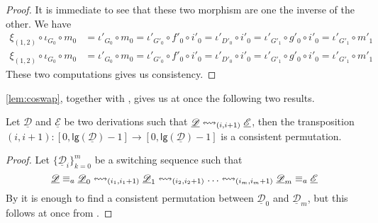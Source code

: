 \documentclass[a4paper,UKenglish,cleveref,pdftex,thm-restate,numberwithinsect]{lipics-v2021}
\newcommand{\dder}[1]{\mathscr{#1}}
\newcommand{\der}[1]{\underline{\dder{#1}}}
\newcommand{\lgh}[0]{\mathsf{lg}}
\newcommand{\shift}[1]{\ensuremath{\mathrel{{\leftrightsquigarrow}_{#1}}}}
\begin{document}
\begin{proof}
	It is immediate to see that these two morphism are one the inverse of the other. We have
\begin{align*}		\xi_{(1,2)}\circ \iota_{G_0}\circ m_0&= \iota'_{G_0}\circ m_0=\iota'_{G'_0}\circ f'_0
	\circ i'_0=\iota'_{D'_0}\circ i'_0=	\iota'_{G'_1}\circ g'_0\circ i'_0=\iota'_{G'_1}\circ m'_1\\
			\xi_{(1,2)}\circ \iota_{G_0}\circ m_0&= \iota'_{G_0}\circ m_0=\iota'_{G'_0}\circ f'_0
	\circ i'_0=\iota'_{D'_0}\circ i'_0=	\iota'_{G'_1}\circ g'_0\circ i'_0=\iota'_{G'_1}\circ m'_1
\end{align*}
	These two computations gives us consistency.
\end{proof}



\cref{lem:coswap}, together with , gives us at once the following two results.

\begin{corollary}\label{cor:coswap}
Let $\der{D}$ and $\der{E}$ be two derivations such that $\der{D} \shift{\transp{i}} \der{E}$, then the transposition $(i,i+1):[0,\lgh(\der{D})-1] \to [0,\lgh(\der{D})-1] $ is a consistent permutation.
\end{corollary}


\propcoswitch*
\label{propcoswitch-proof}
\begin{proof}
	Let $\{\der{D}_{i}\}_{k=0}^m$ be a switching sequence such that 
	    \[\der{D}\equiv_a \der{D}_0 \shift{\transp{i_1}} \der{D}_1 \shift{\transp{i_2}} \ldots \shift{\transp{i_m}}
	\der{D}_m\equiv _a \der{E}\]
By  it is enough to find a consistent permutation between $\der{D}_0$ and $\der{D}_m$, but this follows at once from .
\end{proof}
\end{document}
